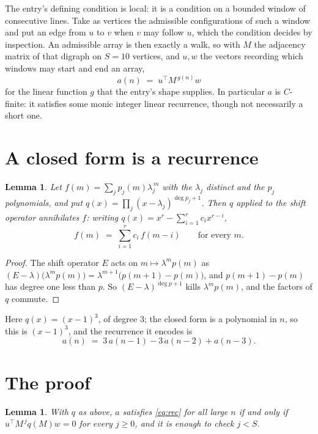\documentclass[11pt,a4paper]{article}
\theoremstyle{plain}
\newtheorem{lemma}[theorem]{Lemma}
\theoremstyle{definition}
\begin{document}
The entry's defining condition is local: it is a condition on a bounded window of consecutive lines. Take as vertices the
admissible configurations of such a window and put an edge from $u$ to $v$ when $v$ may
follow $u$, which the condition decides by inspection. An admissible array is then exactly a
walk, so with $M$ the adjacency matrix of that digraph on $S=10$ vertices, and $u,w$ the
vectors recording which windows may start and end an array,
\[
a(n)\;=\;u^{\!\top}M^{\,g(n)}w
\]
for the linear function $g$ that the entry's shape supplies. In particular $a$ is
$C$-finite: it satisfies some monic integer linear recurrence, though not necessarily a short
one.

\section{A closed form is a recurrence}

\begin{lemma}\label{lem:ann}
Let $f(m)=\sum_{j}p_j(m)\lambda_j^{\,m}$ with the $\lambda_j$ distinct and the $p_j$
polynomials, and put $q(x)=\prod_j(x-\lambda_j)^{\deg p_j+1}$. Then $q$ applied to the shift
operator annihilates $f$: writing $q(x)=x^{r}-\sum_{i=1}^{r}c_ix^{r-i}$,
\[
f(m)\;=\;\sum_{i=1}^{r}c_i\,f(m-i)\qquad\text{for every }m.
\]
\end{lemma}

\begin{proof}
The shift operator $E$ acts on $m\mapsto\lambda^{m}p(m)$ as
$(E-\lambda)\bigl(\lambda^{m}p(m)\bigr)=\lambda^{m+1}\bigl(p(m+1)-p(m)\bigr)$, and
$p(m+1)-p(m)$ has degree one less than $p$. So $(E-\lambda)^{\deg p+1}$ kills
$\lambda^{m}p(m)$, and the factors of $q$ commute.
\end{proof}

Here $q(x)=(x-1)^{3}$, of degree $3$; the closed form is a polynomial in $n$, so this is $(x-1)^{3}$, and the recurrence it encodes is
\begin{equation}\label{eq:rec}
a(n)\;=\;3\,a(n-1) - 3\,a(n-2) + a(n-3).
\end{equation}

\section{The proof}

\begin{lemma}\label{lem:crit}
With $q$ as above, $a$ satisfies \eqref{eq:rec} for all large $n$ if and only if
$u^{\!\top}M^{\,j}q(M)w=0$ for every $j\ge0$, and it is enough to check $j<S$.
\end{lemma}
\end{document}
